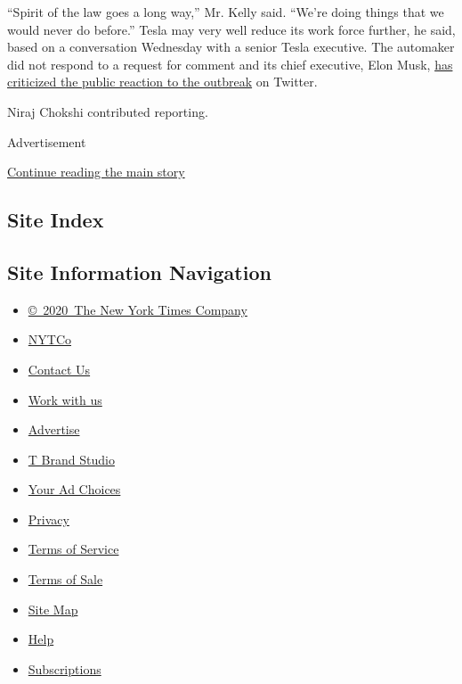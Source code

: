 ``Spirit of the law goes a long way,'' Mr. Kelly said. ``We're doing
things that we would never do before.'' Tesla may very well reduce its
work force further, he said, based on a conversation Wednesday with a
senior Tesla executive. The automaker did not respond to a request for
comment and its chief executive, Elon Musk,
\href{https://twitter.com/elonmusk/status/1239756900255903744}{has
criticized the public reaction to the outbreak} on Twitter.

Niraj Chokshi contributed reporting.

Advertisement

\protect\hyperlink{after-bottom}{Continue reading the main story}

\hypertarget{site-index}{%
\subsection{Site Index}\label{site-index}}

\hypertarget{site-information-navigation}{%
\subsection{Site Information
Navigation}\label{site-information-navigation}}

\begin{itemize}
\tightlist
\item
  \href{https://help.nytimes3xbfgragh.onion/hc/en-us/articles/115014792127-Copyright-notice}{©~2020~The
  New York Times Company}
\end{itemize}

\begin{itemize}
\tightlist
\item
  \href{https://www.nytco.com/}{NYTCo}
\item
  \href{https://help.nytimes3xbfgragh.onion/hc/en-us/articles/115015385887-Contact-Us}{Contact
  Us}
\item
  \href{https://www.nytco.com/careers/}{Work with us}
\item
  \href{https://nytmediakit.com/}{Advertise}
\item
  \href{http://www.tbrandstudio.com/}{T Brand Studio}
\item
  \href{https://www.nytimes3xbfgragh.onion/privacy/cookie-policy\#how-do-i-manage-trackers}{Your
  Ad Choices}
\item
  \href{https://www.nytimes3xbfgragh.onion/privacy}{Privacy}
\item
  \href{https://help.nytimes3xbfgragh.onion/hc/en-us/articles/115014893428-Terms-of-service}{Terms
  of Service}
\item
  \href{https://help.nytimes3xbfgragh.onion/hc/en-us/articles/115014893968-Terms-of-sale}{Terms
  of Sale}
\item
  \href{https://spiderbites.nytimes3xbfgragh.onion}{Site Map}
\item
  \href{https://help.nytimes3xbfgragh.onion/hc/en-us}{Help}
\item
  \href{https://www.nytimes3xbfgragh.onion/subscription?campaignId=37WXW}{Subscriptions}
\end{itemize}

